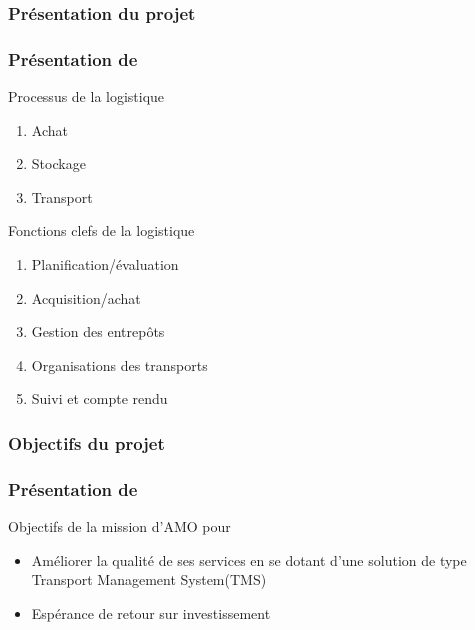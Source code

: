 \subsubsection{Présentation du projet}
\begin{frame}
	\frametitle {Présentation de \mo} \pause
	\begin{block}{Processus de la logistique} \pause
		\begin{enumerate}
			\item Achat \pause
			\item Stockage \pause
			\item Transport
		\end{enumerate}
	\end{block}
	\begin{block}{Fonctions clefs de la logistique} \pause
		\begin{enumerate}
			\item Planification/évaluation \pause
			\item Acquisition/achat \pause
			\item Gestion des entrepôts \pause
			\item Organisations des transports \pause
			\item Suivi et compte rendu
		\end{enumerate}
	\end{block}
\end{frame}

\subsubsection{Objectifs du projet}
\begin{frame}
	\frametitle {Présentation de \mo} 
	\begin{block}{Objectifs de la mission d'AMO pour \mo}
		\begin{itemize}
			\item Améliorer la qualité de ses services en se dotant d'une solution de type Transport Management System(TMS) 
			\item Espérance de retour sur investissement
		\end{itemize}
	\end{block}
\end{frame}

